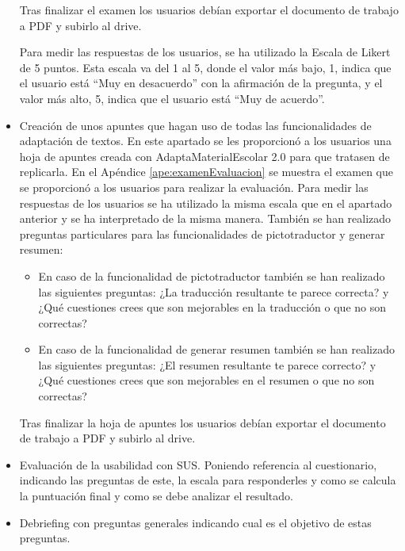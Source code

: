 \begin{itemize}
          Tras finalizar el examen los usuarios debían exportar el documento de trabajo a PDF y subirlo al drive.

          Para medir las respuestas de los usuarios, se ha utilizado la Escala de Likert de 5 puntos. Esta escala va del 1 al 5, donde el valor más bajo, 1, indica que el usuario está ``Muy en desacuerdo'' con la afirmación de la pregunta, y el valor más alto, 5, indica que el usuario está ``Muy de acuerdo''.
    \item Creación de unos apuntes que hagan uso de todas las funcionalidades de adaptación de textos. En este apartado se les proporcionó a los usuarios una hoja de apuntes creada con AdaptaMaterialEscolar 2.0 para que tratasen de replicarla. En el Apéndice \ref{ape:examenEvaluacion} se muestra el examen que se proporcionó a los usuarios para realizar la evaluación. Para medir las respuestas de los usuarios se ha utilizado la misma escala que en el apartado anterior y se ha interpretado de la misma manera. También se han realizado preguntas particulares para las funcionalidades de pictotraductor y generar resumen:
          \begin{itemize}
              \item En caso de la funcionalidad de pictotraductor también se han realizado las siguientes preguntas: ¿La traducción resultante te parece correcta? y ¿Qué cuestiones crees que son mejorables en la traducción o que no son correctas?
              \item En caso de la funcionalidad de generar resumen también se han realizado las siguientes preguntas: ¿El resumen resultante te parece correcto? y ¿Qué cuestiones crees que son mejorables en el resumen o que no son correctas?
          \end{itemize}

          Tras finalizar la hoja de apuntes los usuarios debían exportar el documento de trabajo a PDF y subirlo al drive.
    \item Evaluación de la usabilidad con SUS. Poniendo referencia al cuestionario, indicando las preguntas de este, la escala para responderles y como se calcula la puntuación final y como se debe analizar el resultado.
    \item Debriefing con preguntas generales indicando cual es el objetivo de estas preguntas.
\end{itemize}

